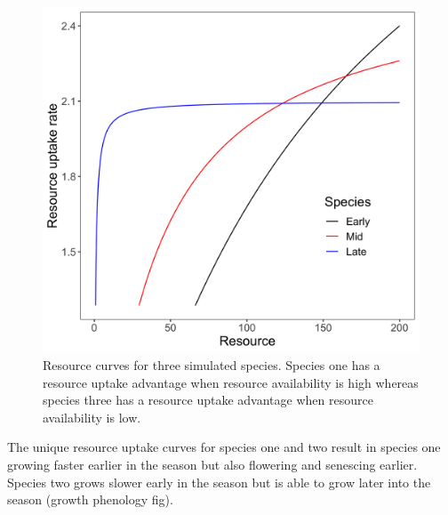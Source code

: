 \documentclass[12pt,]{article}
\begin{document}
\begin{figure}
\centering
\includegraphics{../figures/resource_uptake.png}
\caption{Resource curves for three simulated species. Species one has a
resource uptake advantage when resource availability is high whereas
species three has a resource uptake advantage when resource availability
is low.}
\end{figure}

The unique resource uptake curves for species one and two result in
species one growing faster earlier in the season but also flowering and
senescing earlier. Species two grows slower early in the season but is
able to grow later into the season (growth phenology fig).
\end{document}
